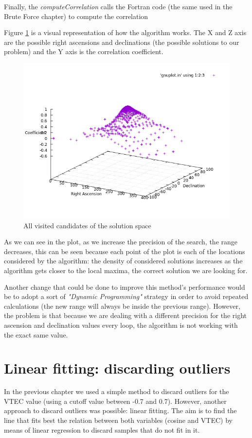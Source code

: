 Finally, the \textit{computeCorrelation} calls the Fortran code (the same used in the Brute Force chapter) to compute the correlation

Figure \ref{fig:consideredSolutions} is a visual representation of how the algorithm works. The X and Z axis are the possible right ascensions
and declinations (the possible solutions to our problem) and the Y axis is the correlation coefficient.

\begin{figure}[!htb]
	\begin{centering}
		\includegraphics[width=0.5\linewidth]{images/ch6/hillClimbing/resultsAll.png}
		\caption{All visited candidates of the solution space}
		\label{fig:consideredSolutions}
	\end{centering}
\end{figure}

As we can see in the plot, as we increase the precision of the search, the range decreases, this can be seen because each point
of the plot is each of the locations considered by the algorithm: the density of considered solutions increases as the algorithm gets closer to the local maxima, the correct solution we are looking for.

Another change that could be done to improve this method's performance would be to adopt a sort of \textit{"Dynamic Programming"} strategy in order to avoid repeated calculations (the new range will always be inside the previous range). However, the problem is that because we are dealing with a different precision for the right ascension and declination values every loop, the algorithm is not working with the exact same value.

\section{Linear fitting: discarding outliers}

In the previous chapter we used a simple method to discard outliers for the VTEC value (using a cutoff value between -0.7 and 0.7). However, another approach to discard outliers was possible: linear fitting. 
The aim is to find the line that fits best the relation between both variables (cosine and VTEC) by means of linear regression to discard samples that do not fit in it.

